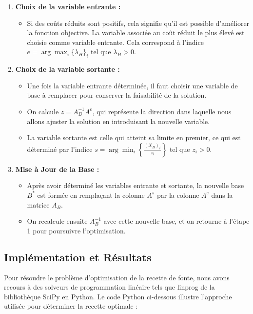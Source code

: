 \documentclass[12pt]{article}
\begin{document}
\begin{enumerate}
    \item \textbf{Choix de la variable entrante :}
    \begin{itemize}
        \item Si des coûts réduits sont positifs, cela signifie qu'il est possible d'améliorer la fonction objective. La variable associée au coût réduit le plus élevé est choisie comme variable entrante. Cela correspond à l'indice \( e = \arg\max_i \{ \lambda_H \}_i \) tel que \( \lambda_H > 0 \).
    \end{itemize}

    \item \textbf{Choix de la variable sortante :}
    \begin{itemize}
        \item Une fois la variable entrante déterminée, il faut choisir une variable de base à remplacer pour conserver la faisabilité de la solution.
        \item On calcule \( z = A_B^{-1} A^e \), qui représente la direction dans laquelle nous allons ajuster la solution en introduisant la nouvelle variable.
        \item La variable sortante est celle qui atteint sa limite en premier, ce qui est déterminé par l'indice \( s = \arg\min_i \left\{ \frac{(X_B)_i}{z_i} \right\} \) tel que \( z_i > 0 \).
    \end{itemize}

    \item \textbf{Mise à Jour de la Base :}
    \begin{itemize}
        \item Après avoir déterminé les variables entrante et sortante, la nouvelle base \( B^* \) est formée en remplaçant la colonne \( A^s \) par la colonne \( A^e \) dans la matrice \( A_B \).
        \item On recalcule ensuite \( A_B^{-1} \) avec cette nouvelle base, et on retourne à l'étape 1 pour poursuivre l'optimisation.
    \end{itemize}
\end{enumerate}




\subsection{Implémentation et Résultats }



Pour résoudre le problème d'optimisation de la recette de fonte, nous 
avons recours à des solveurs de programmation linéaire tels que linprog 
de la bibliothèque SciPy en Python. Le code Python ci-dessous illustre 
l'approche utilisée pour déterminer la recette optimale :
\end{document}
